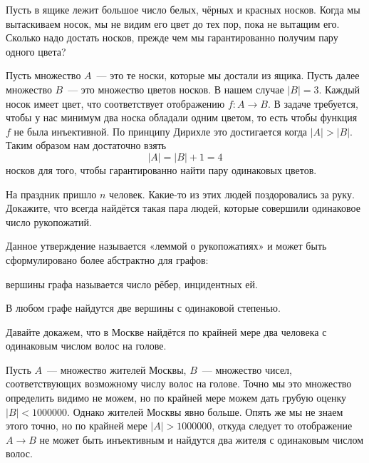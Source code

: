 \begin{example}
Пусть в ящике лежит большое число белых, чёрных и красных носков. Когда мы вытаскиваем носок, мы не видим его цвет до тех пор, пока не вытащим его. Сколько надо достать носков, прежде чем мы гарантированно получим пару одного цвета?
\end{example}

Пусть множество $A$~— это те носки, которые мы достали из ящика. Пусть далее множество $B$~— это множество цветов носков. В нашем случае $|B|=3$. Каждый носок имеет цвет, что соответствует отображению $f:A\to B$. В задаче требуется, чтобы у нас минимум два носка обладали одним цветом, то есть чтобы функция $f$ не была инъективной. По принципу Дирихле это достигается когда $|A|>|B|$. Таким образом нам достаточно взять $$|A|=|B|+1 = 4$$ носков для того, чтобы гарантированно найти пару одинаковых цветов.

\begin{exercise}
На праздник пришло $n$ человек. Какие-то из этих людей поздоровались за руку. Докажите, что всегда найдётся такая пара людей, которые совершили одинаковое число рукопожатий.
\end{exercise}

Данное утверждение называется «леммой о рукопожатиях» и может быть сформулировано более абстрактно для графов:

\begin{definition}
 вершины графа называется число рёбер, инцидентных ей.
\end{definition}

\begin{HandshakesLemma}
В любом графе найдутся две вершины с одинаковой степенью.
\end{HandshakesLemma}

\begin{example}
Давайте докажем, что в Москве найдётся по крайней мере два человека с одинаковым числом волос на голове.

Пусть $A$~— множество жителей Москвы, $B$~— множество чисел, соответствующих возможному числу волос на голове. Точно мы это множество определить видимо не можем, но по крайней мере можем дать грубую оценку $|B|<1000000$. Однако жителей Москвы явно больше. Опять же мы не знаем этого точно, но по крайней мере $|A|>1000000$, откуда следует то отображение $A\to B$ не может быть инъективным и найдутся два жителя с одинаковым числом волос.
\end{example}

